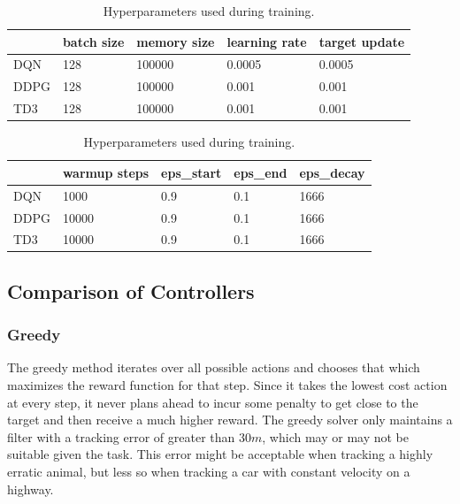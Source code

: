 \documentclass[10pt,twocolumn,letterpaper]{article}
\begin{document}
\begin{table}[]
\begin{tabular}{|l|l|l|l|l|}
\hline
     & batch size & memory size & learning rate & target update \\ \hline
DQN  & 128        & 100000      & 0.0005        & 0.0005        \\ \hline
DDPG & 128        & 100000      & 0.001         & 0.001         \\ \hline
TD3  & 128        & 100000      & 0.001         & 0.001         \\ \hline
\end{tabular}

\begin{tabular}{|l|l|l|l|l|}
\hline
     & warmup steps & eps\_start & eps\_end & eps\_decay \\ \hline
DQN  & 1000         & 0.9            & 0.1          & 1666           \\ \hline
DDPG & 10000        & 0.9            & 0.1          & 1666           \\ \hline
TD3  & 10000        & 0.9            & 0.1          & 1666           \\ \hline
\end{tabular}
\caption{Hyperparameters used during training.}
\label{hyperparams}
\end{table}


\subsection{Comparison of Controllers}

\subsubsection{Greedy}
The greedy method iterates over all possible actions and chooses that which maximizes the reward function for that step.
Since it takes the lowest cost action at every step, it never plans ahead to incur some penalty to get close to the target and then receive a much higher reward.
The greedy solver only maintains a filter with a tracking error of greater than $30m$, which may or may not be suitable given the task.
This error might be acceptable when tracking a highly erratic animal, but less so when tracking a car with constant velocity on a highway.
\end{document}
